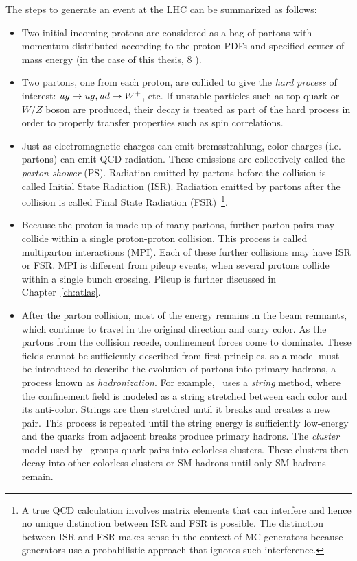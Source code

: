 The steps to generate an event at the LHC can be summarized as follows:
\begin{itemize}
\item Two initial incoming protons are considered as a bag of partons with momentum distributed according to the proton PDFs and specified center of mass energy (in the case of this thesis, 8 \tev).
\item Two partons, one from each proton, are collided to give the \emph{hard process} of interest: $ug \rightarrow ug, u\bar{d}\rightarrow W^{+}$, etc. If unstable particles such as top quark or $W/Z$ boson are produced, their decay is treated as part of the hard process in order to properly transfer properties such as spin correlations.
\item Just as electromagnetic charges can emit bremsstrahlung, color charges (i.e. partons) can emit QCD radiation. These emissions are collectively called the \emph{parton shower} (PS). Radiation emitted by partons before the collision is called Initial State Radiation (ISR). Radiation emitted by partons after the collision is called Final State Radiation (FSR)~\footnote{A true QCD calculation involves matrix elements that can interfere and hence no unique distinction between ISR and FSR is possible. The distinction between ISR and FSR makes sense in the context of MC generators because generators use a probabilistic approach that ignores such interference.}.  
\item Because the proton is made up of many partons, further parton pairs may collide within a single proton-proton collision. This process is called multiparton interactions (MPI). Each of these further collisions may have ISR or FSR. MPI is different from pileup events, when several protons collide within a single bunch crossing. Pileup is further discussed in Chapter~\ref{ch:atlas}.
\item After the parton collision, most of the energy remains in the beam remnants, which continue to travel in the original direction and carry color. As the partons from the collision recede, confinement forces come to dominate. These fields cannot be sufficiently described from first principles, so a model must be introduced to describe the evolution of partons into primary hadrons, a process known as \emph{hadronization}. For example, \py\ uses a \emph{string} method, where the confinement field is modeled as a string stretched between each color and its anti-color. Strings are then stretched until it breaks and creates a new pair. This process is repeated until the string energy is sufficiently low-energy and the quarks from adjacent breaks produce primary hadrons. The \emph{cluster} model used by \hw\ groups quark pairs into colorless clusters. These clusters then decay into other colorless clusters or SM hadrons until only SM hadrons remain.

\end{itemize}
